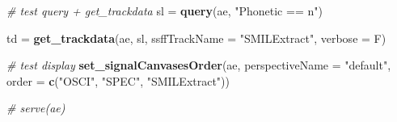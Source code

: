 \documentclass[]{book}
\newenvironment{Shaded}{\begin{snugshade}}{\end{snugshade}}
\newcommand{\CommentTok}[1]{\textcolor[rgb]{0.56,0.35,0.01}{\textit{#1}}}
\newcommand{\DataTypeTok}[1]{\textcolor[rgb]{0.13,0.29,0.53}{#1}}
\newcommand{\KeywordTok}[1]{\textcolor[rgb]{0.13,0.29,0.53}{\textbf{#1}}}
\newcommand{\NormalTok}[1]{#1}
\newcommand{\StringTok}[1]{\textcolor[rgb]{0.31,0.60,0.02}{#1}}
\begin{document}
\begin{Shaded}
\begin{Highlighting}[]
\CommentTok{# test query + get_trackdata}
\NormalTok{sl =}\StringTok{ }\KeywordTok{query}\NormalTok{(ae, }\StringTok{"Phonetic == n"}\NormalTok{)}

\NormalTok{td =}\StringTok{ }\KeywordTok{get_trackdata}\NormalTok{(ae, }
\NormalTok{                   sl, }
                   \DataTypeTok{ssffTrackName =} \StringTok{"SMILExtract"}\NormalTok{,}
                   \DataTypeTok{verbose =}\NormalTok{ F)}

\CommentTok{# test display}
\KeywordTok{set_signalCanvasesOrder}\NormalTok{(ae, }
                        \DataTypeTok{perspectiveName =} \StringTok{"default"}\NormalTok{,}
                        \DataTypeTok{order =} \KeywordTok{c}\NormalTok{(}\StringTok{"OSCI"}\NormalTok{, }\StringTok{"SPEC"}\NormalTok{, }\StringTok{"SMILExtract"}\NormalTok{))}

\CommentTok{# serve(ae)}
\end{Highlighting}
\end{Shaded}


\end{document}
